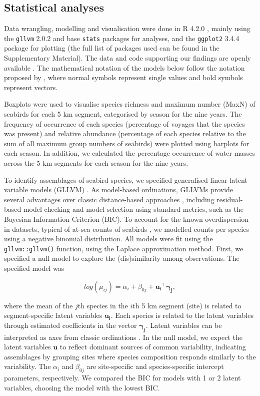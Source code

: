 \documentclass[preprint, 3p, authoryear]{elsarticle} %
\begin{document}
\hypertarget{statistical-analyses}{%
\subsection{Statistical analyses}\label{statisticalanalyses}}

Data wrangling, modelling and visualisation were done in R 4.2.0 \citep{rcoreteam}, mainly using the \texttt{gllvm} 2.0.2 \citep{niku2019} and base \texttt{stats} packages for analyses, and the \texttt{ggplot2} 3.4.4 \citep{ggplot2} package for plotting (the full list of packages used can be found in the Supplementary Material). The data and code supporting our findings are openly available \citep{daudt_data_2024}. The mathematical notation of the models below follow the notation proposed by \citet{edwards2019}, where normal symbols represent single values and bold symbols represent vectors.

Boxplots were used to visualise species richness and maximum number (MaxN) of seabirds for each 5 km segment, categorised by season for the nine years. The frequency of occurrence of each species (percentage of voyages that the species was present) and relative abundance (percentage of each species relative to the sum of all maximum group numbers of seabirds) were plotted using barplots for each season. In addition, we calculated the percentage occurrence of water masses across the 5 km segments for each season for the nine years.

To identify assemblages of seabird species, we specified generalised linear latent variable models (GLLVM) \citep{hui2015, niku2019}. As model-based ordinations, GLLVMs provide several advantages over classic distance-based approaches \citep{warton2012, warton2015}, including residual-based model checking and model selection using standard metrics, such as the Bayesian Information Criterion (BIC). To account for the known overdispersion in datasets, typical of at-sea counts of seabirds \citep{gall2022, sojitra2022, linden2011}, we modelled counts per species using a negative binomial distribution. All models were fit using the \texttt{gllvm::gllvm()} function, using the Laplace approximation method. First, we specified a null model to explore the (dis)similarity among observations. The specified model was

\[
log(\mu_{ij}) = \alpha_i + \beta_{0j} + \mathbf{u_i}^\top \mathbf{\gamma_j},
\]

\noindent
where the mean of the \(j\)th species in the \(i\)th 5 km segment (site) is related to segment-specific latent variables \(\mathbf{u_i}\). Each species is related to the latent variables through estimated coefficients in the vector \(\mathbf{\gamma_j}\). Latent variables can be interpreted as axes from classic ordinations \citep{niku2019}. In the null model, we expect the latent variables \(\mathbf{u}\) to reflect dominant sources of common variability, indicating assemblages by grouping sites where species composition responds similarly to the variability. The \(\alpha_i\) and \(\beta_{0j}\) are site-specific and species-specific intercept parameters, respectively. We compared the BIC for models with 1 or 2 latent variables, choosing the model with the lowest BIC.
\end{document}
